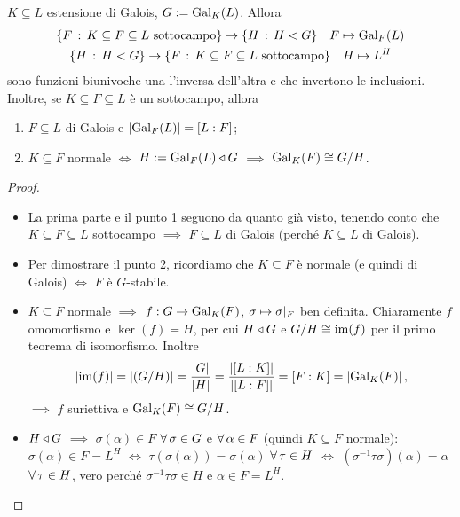 \begin{teor}
$K\subseteq L$ estensione di Galois, $G:=\Gal[K]{L}$. Allora
\begin{gather*}
\{F\st K\subseteq F\subseteq L\text{ sottocampo}\}\to\{H\st H<G\}\quad F\mapsto\Gal[F]{L} \\
\{H\st H<G\}\to\{F\st K\subseteq F\subseteq L\text{ sottocampo}\}\quad H\mapsto L^H
\end{gather*}
sono funzioni biunivoche una l'inversa dell'altra e che invertono le inclusioni. Inoltre, se $K\subseteq F\subseteq L$ è un sottocampo, allora
\begin{enumerate}
\item $F\subseteq L$ di Galois e $\card{\Gal[F]{L}}=[L:F]$;
\item $K\subseteq F$ normale $\iff$ $H:=\Gal[F]{L}\normal G$ $\implies$ $\Gal[K]{F}\iso G/H$.
\end{enumerate}
\end{teor}

\begin{proof}
\begin{itemize}
\item La prima parte e il punto 1 seguono da quanto gi\`a visto, tenendo conto che $K\subseteq F\subseteq L$ sottocampo $\implies$ $F\subseteq L$ di Galois (perché $K\subseteq L$ di Galois).
\item Per dimostrare il punto 2, ricordiamo che $K\subseteq F$ è normale (e quindi di Galois) $\iff$ $F$ è $G$-stabile.
\item $K\subseteq F$ normale $\implies$ $f : G\to\Gal[K]{F}$, $\sigma\mapsto\sigma\rest{F}$ ben definita. Chiaramente $f$ omomorfismo e $\ker(f)=H$, per cui $H\normal G$ e $G/H\iso\im(f)$ per il primo teorema di isomorfismo. Inoltre
\[
\card{\im(f)}=\card{(G/H)}=\frac{\card{G}}{\card{H}}=\frac{\card{[L:K]}}{\card{[L:F]}}=[F:K]=\card{\Gal[K]{F}},
\]
$\implies$ $f$ suriettiva e $\Gal[K]{F}\iso G/H$.
\item $H\normal G$ $\implies$ $\sigma(\alpha)\in F$ $\all\sigma\in G$ e $\all\alpha\in F$ (quindi $K\subseteq F$ normale): $\sigma(\alpha)\in F=L^H$ $\iff$ $\tau(\sigma(\alpha))=\sigma(\alpha)$ $\all \tau\in H$ $\iff$ $(\sigma^{-1}\tau\sigma)(\alpha)=\alpha$ $\all\tau\in H$, vero perché $\sigma^{-1}\tau\sigma\in H$ e $\alpha\in F=L^H$.
\end{itemize}
\end{proof}


